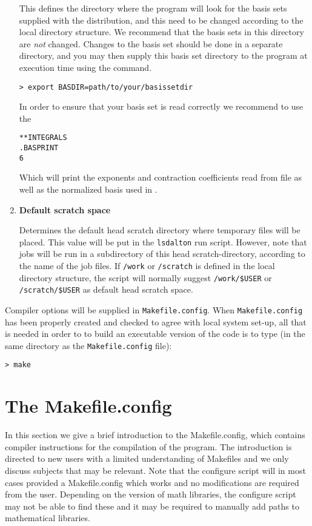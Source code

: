 \begin{enumerate}
This defines the directory where the program will look for the
basis sets supplied with the distribution, and this need to be
changed according to the local directory structure. We recommend
that the basis sets in this directory are {\em not} changed.
Changes to the basis set should be done in a separate
directory, and you may then supply this basis set directory to the program
at execution time using the command.
\begin{verbatim}
> export BASDIR=path/to/your/basissetdir
\end{verbatim}
In order to ensure that your basis set is read correctly we recommend to use the
\begin{verbatim}
**INTEGRALS
.BASPRINT 
6
\end{verbatim}
Which will print the exponents and contraction coefficients read from file as 
well as the normalized basis used in {\lsdalton}.  

\item {\bf Default scratch space}

Determines the default head scratch
directory where temporary files will be placed. This value will be put
in the \verb|lsdalton| run script. However, note that jobs will be run in
a subdirectory of this head scratch-directory, according to the name
of the job files. If \verb|/work| or \verb|/scratch| is defined in the
local directory structure, the script will normally suggest
\verb|/work/$USER| or \verb|/scratch/$USER| as default head scratch space.

\end{enumerate}

Compiler options will be supplied in \verb|Makefile.config|.
When  \verb|Makefile.config| has been properly
created and checked
to agree with local system set-up, all that is needed in order to
to build an executable version of the
code is to type
(in the same directory as the \verb|Makefile.config| file):
\begin{verbatim}
> make
\end{verbatim}

\section{The Makefile.config}\label{sec:makefileconfig}

In this section we give a brief introduction to the Makefile.config, which contains compiler instructions for the compilation of the program. 
The introduction is directed to new users with a limited understanding of Makefiles and we only discuss subjects that may be relevant. 
Note that the configure script will in most cases provided a Makefile.config which works and no modifications are required from the user. 
Depending on the version of math libraries, the configure script may not be able to find these and it may be required to manually 
add paths to mathematical libraries. 


